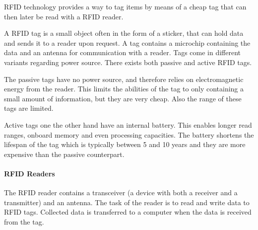 RFID technology provides a way to tag items by means of a cheap tag that can then later be read with a RFID reader.

A RFID tag is a small object often in the form of a sticker, that can hold data and sends it to a reader upon request.
A tag contains a microchip containing the data and an antenna for communication with a reader.
Tags come in different variants regarding power source.
There exists both passive and active RFID tags.\cite{rfidreview}

The passive tags have no power source, and therefore relies on electromagnetic energy from the reader.
This limits the abilities of the tag to only containing a small amount of information, but they are very cheap.
Also the range of these tags are limited. \cite{rfidreview}

Active tags one the other hand have an internal battery.
This enables longer read ranges, onboard memory and even processing capacities.
The battery shortens the lifespan of the tag which is typically between 5 and 10 years and they are more expensive than the passive counterpart. \cite{rfidreview}

\paragraph{RFID Readers}
The RFID reader contains a transceiver (a device with both a receiver and a transmitter) and an antenna.
The task of the reader is to read and write data to RFID tags.
Collected data is transferred to a computer when the data is received from the tag.\cite{rfidreview}